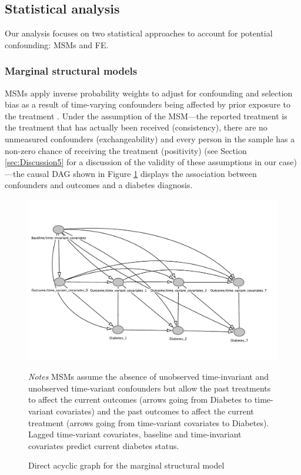 \subsection{Statistical analysis}


Our analysis focuses on two statistical approaches to account for potential confounding: \acfp{MSM} and \acf{FE}. 

\subsubsection*{Marginal structural models}

\acp{MSM} apply inverse probability weights to adjust for confounding and selection bias as a result of time-varying confounders being affected by prior exposure to the treatment \autocite{Robins2000}. Under the assumption of the \ac{MSM}\autocite{Robins2000}---the reported treatment is the treatment that has actually been received (consistency), there are no unmeasured confounders (exchangeability) and every person in the sample has a non-zero chance of receiving the treatment (positivity) (see Section \ref{sec:Discussion5} for a discussion of the validity of these assumptions in our case)---the causal \ac{DAG} shown in Figure \ref{fig:DAG_msm} displays the association between confounders and outcomes and a diabetes diagnosis.

\begin{figure}
\begin{center}
\caption{\label{fig:DAG_msm} Direct acyclic graph for the marginal structural model}
\includegraphics[scale=0.5]{Chapter5/DAG/dag_msm_alt}
\end{center}
\footnotesize{\textit{Notes} \acp{MSM} assume the absence of unobserved time-invariant and unobserved time-variant confounders but allow the past treatments to affect the current outcomes  (arrows going from Diabetes to time-variant covariates) and the past outcomes to affect the current treatment (arrows going from time-variant covariates to Diabetes).  Lagged time-variant covariates, baseline and time-invariant covariates predict current diabetes status.}

\end{figure}
\clearpage

